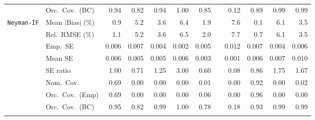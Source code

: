\begin{landscape}
\begin{longtable}{llrrrrrrrrrr}
 & Orc.\ Cov.\ (BC) & \cellcolor{rankone}0.94 & 0.82 & \cellcolor{ranktwo}0.94 & 1.00 & 0.85 &  & 0.12 & 0.89 & 0.99 & \cellcolor{rankthree}0.99 \\
\addlinespace[2pt]
\quad \texttt{Neyman-IF} & Mean $|$Bias$|$ (\%) & \cellcolor{ranktwo}0.9 & 5.2 & 3.6 & 6.4 & \cellcolor{rankthree}1.9 &  & 7.6 & \cellcolor{rankone}0.1 & 6.1 & 3.5 \\
 & Rel.\ RMSE (\%) & \cellcolor{ranktwo}1.1 & 5.2 & 3.6 & 6.5 & \cellcolor{rankthree}2.0 &  & 7.7 & \cellcolor{rankone}0.7 & 6.1 & 3.5 \\
 & Emp.\ SE & 0.006 & 0.007 & 0.004 & 0.002 & 0.005 &  & 0.012 & 0.007 & 0.004 & 0.006 \\
 & Mean SE & 0.006 & 0.005 & 0.005 & 0.006 & 0.003 &  & 0.001 & 0.006 & 0.007 & 0.010 \\
 & SE ratio & \cellcolor{rankone}1.00 & 0.71 & \cellcolor{rankthree}1.25 & 3.00 & 0.60 &  & 0.08 & \cellcolor{ranktwo}0.86 & 1.75 & 1.67 \\
 & Nom.\ Cov. & \cellcolor{ranktwo}0.69 & 0.00 & 0.00 & 0.00 & 0.01 &  & 0.00 & \cellcolor{rankone}0.92 & 0.00 & \cellcolor{rankthree}0.02 \\
 & Orc.\ Cov.\ (Emp) & \cellcolor{ranktwo}0.69 & 0.00 & 0.00 & 0.00 & \cellcolor{rankthree}0.06 &  & 0.00 & \cellcolor{rankone}0.96 & 0.00 & 0.00 \\
 & Orc.\ Cov.\ (BC) & \cellcolor{rankone}0.95 & 0.82 & \cellcolor{rankthree}0.99 & 1.00 & 0.78 &  & 0.18 & \cellcolor{ranktwo}0.93 & 0.99 & 0.99 \\
\addlinespace[2pt]
\end{longtable}
\end{landscape}
